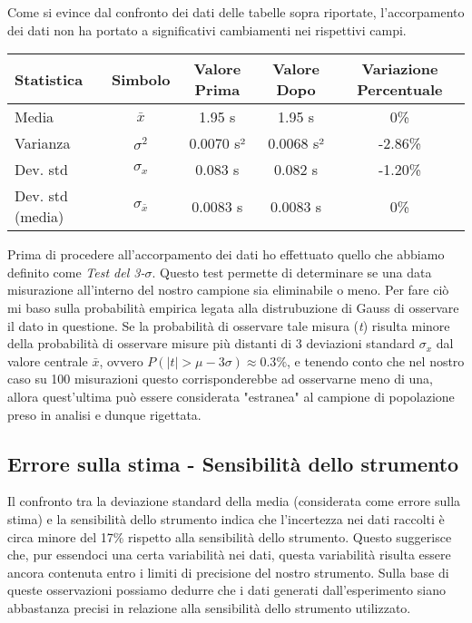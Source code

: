 \documentclass{article}
\begin{document}
\noindent
Come si evince dal confronto dei dati delle tabelle sopra riportate, l'accorpamento dei dati non ha portato a significativi cambiamenti nei rispettivi campi.
\begin{table}[ht]
\centering
{}
\begin{tabular}{lcccc}
\toprule
\textbf{Statistica} & \textbf{Simbolo} & \textbf{Valore Prima} & \textbf{Valore Dopo} & \textbf{Variazione Percentuale} \\
\midrule
Media & $\bar{x}$ & 1.95 s & 1.95 s & 0\% \\
Varianza & $\sigma^2$ & 0.0070 s² & 0.0068 s² & -2.86\% \\
Dev. std & $\sigma_x$ & 0.083 s & 0.082 s & -1.20\% \\
Dev. std (media) & $\sigma_{\bar{x}}$ & 0.0083 s & 0.0083 s & 0\% \\
\bottomrule
\end{tabular}
\label{tab:dati_accorpati}
\end{table}

Prima di procedere all'accorpamento dei dati ho effettuato quello che abbiamo definito come \textit{Test del 3-$\sigma$}. Questo test permette di determinare se una data misurazione all'interno del nostro campione sia eliminabile o meno. Per fare ciò mi baso sulla probabilità empirica legata alla distrubuzione di Gauss di osservare il dato in questione.
\newline\indent
Se la probabilità di osservare tale misura (\textit{t}) risulta minore della probabilità di osservare misure più distanti di 3 deviazioni standard $\sigma_x$ dal valore centrale $\bar{x}$, ovvero $P( |t| > \mu - 3\sigma) \approx 0.3\% $, e tenendo conto che nel nostro caso su 100 misurazioni questo corrisponderebbe ad osservarne meno di una, allora quest'ultima può essere considerata "estranea" al campione di popolazione preso in analisi e dunque rigettata.
\newline
\subsection{Errore sulla stima - Sensibilità dello strumento}
Il confronto tra la deviazione standard della media (considerata come errore sulla stima) e la sensibilità dello strumento indica che l'incertezza nei dati raccolti è circa minore del 17\% rispetto alla sensibilità dello strumento. Questo suggerisce che, pur essendoci una certa variabilità nei dati, questa variabilità risulta essere ancora contenuta entro i limiti di precisione del nostro strumento. Sulla base di queste osservazioni possiamo dedurre che i dati generati dall'esperimento siano abbastanza precisi in relazione alla sensibilità dello strumento utilizzato.
\end{document}
